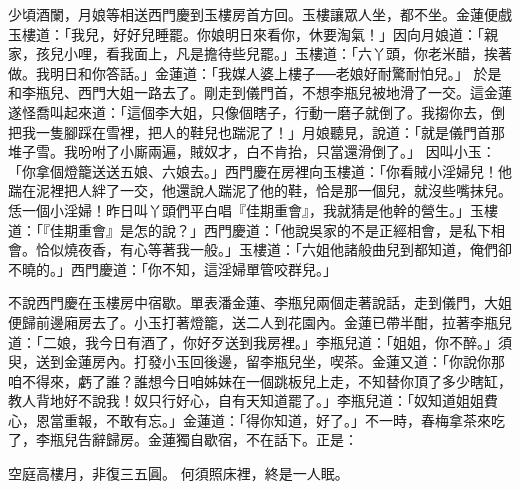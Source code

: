 \begin{showcontents}{}
少頃酒闌，月娘等相送西門慶到玉樓房首方回。玉樓讓眾人坐，都不坐。金蓮便戲玉樓道：「我兒，好好兒睡罷。你娘明日來看你，休要淘氣！」因向月娘道：「親家，孩兒小哩，看我面上，凡是擔待些兒罷。」玉樓道：「六丫頭，你老米醋，挨著做。我明日和你答話。」金蓮道：「我媒人婆上樓子──老娘好耐驚耐怕兒。」 於是和李瓶兒、西門大姐一路去了。剛走到儀門首，不想李瓶兒被地滑了一交。這金蓮遂怪喬叫起來道：「這個李大姐，只像個瞎子，行動一磨子就倒了。我搊你去，倒把我一隻腳踩在雪裡，把人的鞋兒也踹泥了！」月娘聽見，說道：「就是儀門首那堆子雪。我吩咐了小廝兩遍，賊奴才，白不肯抬，只當還滑倒了。」 因叫小玉：「你拿個燈籠送送五娘、六娘去。」西門慶在房裡向玉樓道：「你看賊小淫婦兒！他踹在泥裡把人絆了一交，他還說人踹泥了他的鞋，恰是那一個兒，就沒些嘴抹兒。恁一個小淫婦！昨日叫丫頭們平白唱『佳期重會』，我就猜是他幹的營生。」玉樓道：「『佳期重會』是怎的說？」西門慶道：「他說吳家的不是正經相會，是私下相會。恰似燒夜香，有心等著我一般。」玉樓道：「六姐他諸般曲兒到都知道，俺們卻不曉的。」西門慶道：「你不知，這淫婦單管咬群兒。」

不說西門慶在玉樓房中宿歇。單表潘金蓮、李瓶兒兩個走著說話，走到儀門，大姐便歸前邊廂房去了。小玉打著燈籠，送二人到花園內。金蓮已帶半酣，拉著李瓶兒道：「二娘，我今日有酒了，你好歹送到我房裡。」李瓶兒道：「姐姐，你不醉。」須臾，送到金蓮房內。打發小玉回後邊，留李瓶兒坐，喫茶。金蓮又道：「你說你那咱不得來，虧了誰？誰想今日咱姊妹在一個跳板兒上走，不知替你頂了多少瞎缸，教人背地好不說我！奴只行好心，自有天知道罷了。」李瓶兒道：「奴知道姐姐費心，恩當重報，不敢有忘。」金蓮道：「得你知道，好了。」不一時，春梅拿茶來吃了，李瓶兒告辭歸房。金蓮獨自歇宿，不在話下。正是：

空庭高樓月，非復三五圓。
何須照床裡，終是一人眠。



\end{showcontents}

